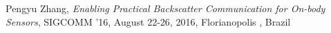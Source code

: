 \documentclass[conference,compsoc]{IEEEtran}
\begin{document}
%
%
%
\begin{thebibliography}{1}

Pengyu Zhang, \emph{Enabling Practical Backscatter Communication for On-body Sensors}, SIGCOMM ’16, August 22-26, 2016, Florianopolis , Brazil 

\end{thebibliography}



\end{document}
